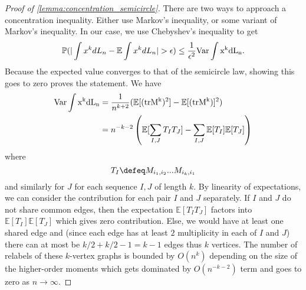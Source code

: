 \begin{proof}[Proof of \ref{lemma:concentration_semicircle}]
    There are two ways to approach a concentration inequality. Either use Markov's inequality, or some variant of Markov's inequality. In our case, we use Chebyshev's inequality to get \[
     \mathbb{P}(|\int x^k d L_n - \mathbb{E}\int x^k  dL_n|>\epsilon) \leq \frac{1}{\epsilon^2} \rm{Var} \int x^k d L_n.
    \]
    Because the expected value converges to that of the semicircle law, showing this goes to zero proves the statement. 
    We have \begin{align*}
        \rm{Var} \int x^k dL_n &= \frac{1}{n^{k+2}} (\mathbb{E}[(\rm{tr}M^k)^2] - \mathbb{E}[(\rm{tr}M^k)]^2)
        \\
        &= n^{-k-2} \left(\mathbb E [\sum_{I,J} T_IT_J] - \sum_{I,J} \mathbb{E}[T_I] \mathbb{E}[T_J]\right) 
    \end{align*}
    where \[
    T_I \defeq M_{i_1,i_2}...M_{i_k,i_1}
    \] and similarly for $J$ for each sequence $I,J$ of length $k$.
    By linearity of expectations, we can consider the contribution for each pair $I$ and $J$ separately. If $I$ and $J$ do not share common edges, then the expectation $\mathbb{E}[T_IT_J]$ factors into $\mathbb{E}[T_I]\mathbb{E}[T_J]$ which gives zero contribution. Else, we would have at least one shared edge and (since each edge has at least $2$ multiplicity in each of $I$ and $J$) there can at most be $k/2+k/2-1=k-1$ edges thus $k$ vertices. The number of relabels of these $k$-vertex graphs is bounded by $O(n^k)$ depending on the size of the higher-order moments which gets dominated by $O(n^{-k-2})$ term and goes to zero as $n\to \infty$.
\end{proof}

